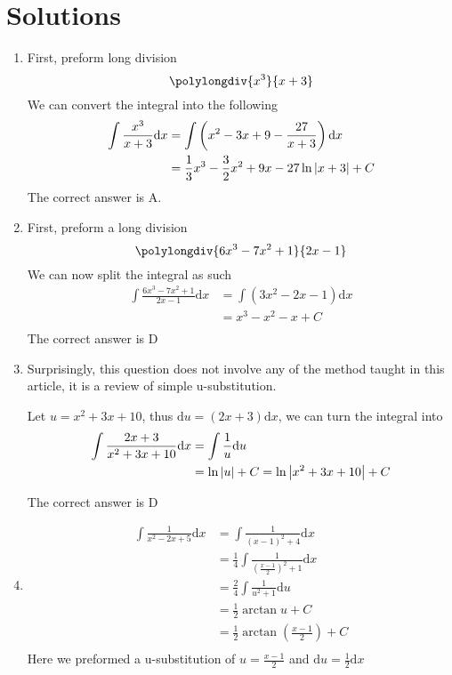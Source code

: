 \documentclass{article}
\numberwithin{equation}{section}
\begin{document}
\section{Solutions}
\begin{enumerate}
    \item First, preform long division
    \[
    \polylongdiv{x^3}{x+3}
    \]
    We can convert the integral into the following
    \begin{align*}
        \int \frac{x^3}{x+3}\mathrm{d}x &= \int \left(x^2 - 3x + 9 - \frac{27}{x+3}\right) \mathrm{d}x\\
        &= \frac{1}{3}x^3 - \frac{3}{2} x^2 + 9x - 27\ln{\abs{x+3}} + C\\
    \end{align*}
    The correct answer is A.
    \item First, preform a long division
    \[
    \polylongdiv{6x^3-7x^2+1}{2x-1}
    \]
    We can now split the integral as such
    \begin{align*}
        \int \frac{6x^3-7x^2+1}{2x-1}\mathrm{d}x &= \int \left(3x^2-2x-1\right) \mathrm{d}x\\
        &= x^3 - x^2 - x + C\\
    \end{align*}
    The correct answer is D
    \item Surprisingly, this question does not involve any of the method taught in this article, it is a review of simple u-substitution.
    
    Let $u = x^2 + 3x + 10$, thus $\mathrm{d}u = (2x+3)\mathrm{d}x$, we can turn the integral into
    \begin{align*}
        \int \frac{2x+3}{x^2 + 3x + 10}\mathrm{d}x &= \int \frac{1}{u}\mathrm{d}u\\
        &= \ln \abs{u} + C = \ln \abs{x^2+3x+10}+C
    \end{align*}

    The correct answer is D
    \item \begin{align*}
        \int \frac{1}{x^2-2x+5}\mathrm{d}x &= \int \frac{1}{(x-1)^2 + 4}\mathrm{d}x\\
        &= \frac{1}{4}\int \frac{1}{\left(\frac{x-1}{2}\right)^2+1} \mathrm{d}x\\
        &= \frac{2}{4}\int \frac{1}{u^2 + 1}\mathrm{d}u\\
        &=\frac{1}{2}\arctan u + C \\
        &= \frac{1}{2}\arctan \left(\frac{x-1}{2}\right) + C\\
    \end{align*}
    Here we preformed a u-substitution of $u = \frac{x-1}{2}$ and $\mathrm{d}u = \frac{1}{2}\mathrm{d}x$


\end{enumerate}
\end{document}
